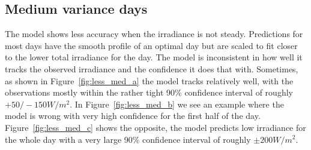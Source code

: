 \subsection{Medium variance days}
The model shows less accuracy when the irradiance is not steady. Predictions for most days have the smooth profile of an optimal day but are scaled to fit closer to the lower total irradiance for the day. The model is inconsistent in how well it tracks the observed irradiance and the confidence it does that with. Sometimes, as shown in Figure~\ref{fig:less_med_a} the model tracks relatively well, with the observations mostly within the rather tight 90\% confidence interval of roughly $+50/-150 W/m^2$. In Figure~\ref{fig:less_med_b} we see an example where the model is wrong with very high confidence for the first half of the day. Figure~\ref{fig:less_med_c} shows the opposite, the model predicts low irradiance for the whole day with a very large 90\% confidence interval of roughly $\pm200 W/m^2$.


